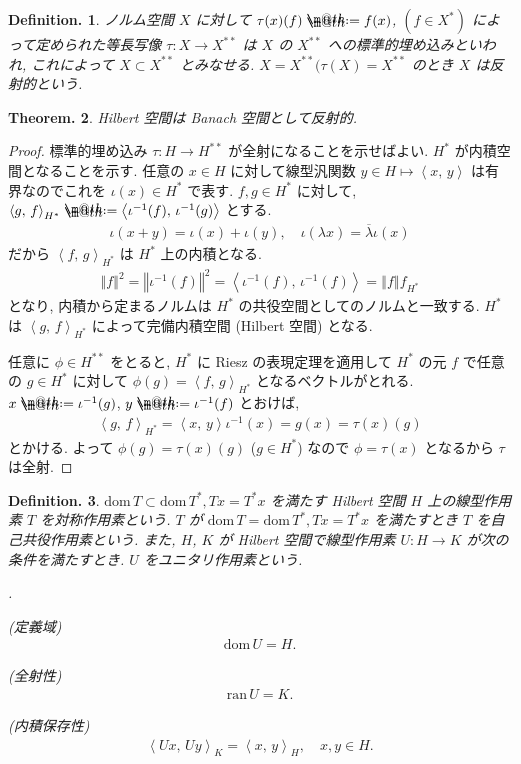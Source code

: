 \documentclass[openany, a4paper, oneside]{jsbook}
\makeatletter
\newcounter{enum2}
\renewenvironment{enumerate}{%
\begin{list}%
{%
\arabic{enum2}.\ \,%
}%
{%
\usecounter{enum2}
\setlength{\itemindent}{0pt}%
\setlength{\leftmargin}{15pt}%
\setlength{\rightmargin}{0pt}%
\setlength{\labelsep}{0pt}%
\setlength{\labelwidth}{6pt}%
\setlength{\itemsep}{0pt}%
\setlength{\parsep}{0pt}%
\setlength{\listparindent}{0pt}%
}
}{%
\end{list}%
}
\newcommand*{\defeq}{\mathrel{\rlap{%
\raisebox{0.3ex}{$\m@th\cdot$}}%
\raisebox{-0.3ex}{$\m@th\cdot$}}%
=}
\newcommand{\dom}{\mathrm{dom}\,}
\newcommand{\ran}{\mathrm{ran}\,}
\theoremstyle{break}
\theoremstyle{breakdefn}
\newtheorem{thm}{Theorem.}[section]
\newtheorem{defn}[thm]{Definition.}
\newcommand{\norm}[1]{\left\Vert#1\right\Vert}
\newcommand{\bkt}[2]{\left\langle#1,\,#2\right\rangle}
\makeatother
\begin{document}
\begin{defn}
ノルム空間 $X$ に対して $\tau (x) (f) \defeq f (x)$, $(f\in X^*)$ によって定められた等長写像
$\tau \colon X \to X^{**}$ は $X$ の $X^{**}$ への標準的埋め込みといわれ,
これによって $X \subset X^{**}$ とみなせる.
$X = X^{**} (\tau (X) = X^{**}$ のとき $X$ は反射的という.
\end{defn}
\begin{thm}
 Hilbert 空間は Banach 空間として反射的.
\end{thm}
\begin{proof}
標準的埋め込み $\tau \colon H \to H^{**}$ が全射になることを示せばよい.
$H^*$ が内積空間となることを示す.
任意の $x \in H$ に対して線型汎関数 $y \in H \mapsto \bkt{x}{y}$ は有界なのでこれを
$\iota (x) \in H^*$ で表す.
$f, g \in H^*$ に対して, $\bkt{g}{f}_{H^*} \defeq \bkt{\iota^{-1}(f)}{\iota^{-1}(g)}$ とする.
\begin{align}
 \iota (x + y)
 =
 \iota (x) + \iota (y), \quad
 \iota (\lambda x)
 =
 \overline{\lambda} \iota (x)
\end{align}
だから $\bkt{f}{g}_{H^*}$ は $H^*$ 上の内積となる.
\begin{align}
 \norm{f}^2
 =
 \norm{\iota^{-1}(f)}^2
 =
 \bkt{\iota^{-1}(f)}{\iota^{-1}(f)}
 =
 \norm{f}{f}_{H^*}
\end{align}
となり, 内積から定まるノルムは $H^*$ の共役空間としてのノルムと一致する.
$H^*$ は $\bkt{g}{f}_{H^*}$ によって完備内積空間 (Hilbert 空間) となる.

任意に $\phi \in H^{**}$ をとると, $H^*$ に Riesz の表現定理を適用して
$H^*$ の元 $f$ で任意の $g \in H^*$ に対して $\phi (g) = \bkt{f}{g}_{H^*}$ となるベクトルがとれる.
$x \defeq \iota^{-1}(g)$, $y \defeq \iota^{-1}(f)$ とおけば,
\begin{align}
 \bkt{g}{f}_{H^*}
 =
 \bkt{x}{y} \iota^{-1}(x)
 =
 g(x)
 =
 \tau (x) (g)
\end{align}
とかける.
よって $\phi (g) = \tau (x) (g)$ ($g \in H^*$) なので $\phi = \tau (x)$ となるから $\tau$ は全射.
\end{proof}

\begin{defn}
 $\dom T \subset \dom T^*, Tx = T^*x$ を満たす Hilbert 空間 $H$ 上の線型作用素 $T$ を対称作用素という.
 $T$ が $\dom T = \dom T^*, Tx = T^*x$ を満たすとき $T$ を自己共役作用素という.
 また, $H$, $K$ が Hilbert 空間で線型作用素 $U \colon H \to K$ が次の条件を満たすとき. $U$ をユニタリ作用素という.
\begin{enumerate}
\item \textup{(定義域)}
   \begin{align}
    \dom U = H.
   \end{align}
\item \textup{(全射性)}
   \begin{align}
    \ran U
    =
    K.
   \end{align}
\item \textup{(内積保存性)}
   \begin{align}
    \bkt{Ux}{Uy}_{K}
    =
    \bkt{x}{y}_{H}, \quad x, y \in H.
   \end{align}
\end{enumerate}
\end{defn}
\end{document}
